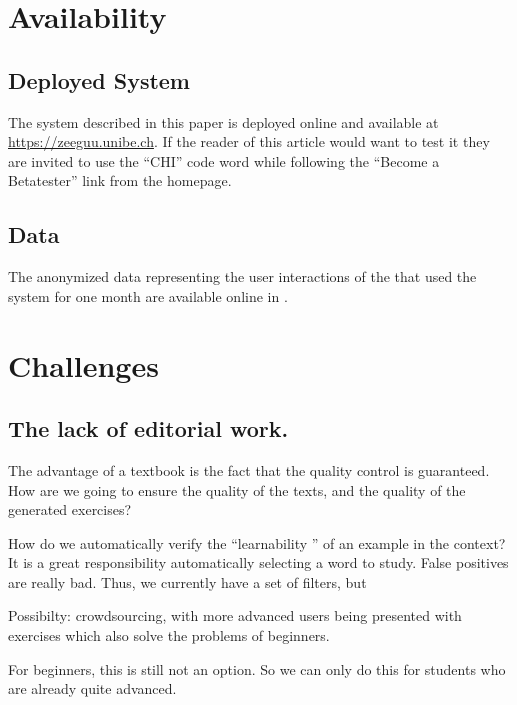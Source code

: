 


\section{Availability}

\subsection{Deployed System}
The system described in this paper is deployed online and available at \url{https://zeeguu.unibe.ch}. If the reader of this article would want to test it they are invited to use the ``CHI'' code word while following the  ``Become a Betatester'' link from the homepage.



\subsection{Data}
The anonymized data representing the user interactions of the \students that used the system for one month are available online in . 




\newpage
\section{Challenges}

\subsection{The lack of editorial work.}
The advantage of a textbook is the fact that the quality control is guaranteed. How are we going to ensure the quality of the texts, and the quality of the generated exercises? 

How do we automatically verify the ``learnability '' of an example in the context? It is a great responsibility automatically selecting a word to study. False positives are really bad. Thus, we currently have a set of filters, but 

Possibilty: crowdsourcing, with more advanced users being presented with exercises which also solve the problems of beginners. 

For beginners, this is still not an option. So we can only do this for students who are already quite advanced. 





